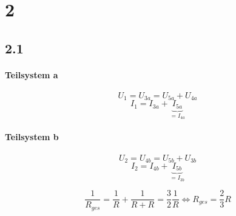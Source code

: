 \documentclass{article}
\begin{document}
\section*{2}
\subsection*{2.1}
\paragraph{Teilsystem a}
\begin{equation}
    U_1 = U_{3a} = U_{5a} + U_{4a}
\end{equation}
\begin{equation}
    I_1 = I_{3a} + \underbrace{I_{5a}}_{=I_{4a}}
\end{equation}
\paragraph{Teilsystem b}
\begin{equation}
    U_2 = U_{4b} = U_{5b} + U_{3b}
\end{equation}
\begin{equation}
    I_2 = I_{4b} + \underbrace{I_{5b}}_{=I_{3b}}
\end{equation}

\begin{equation}
    \frac{1}{R_{ges}} = \frac{1}{R} + \frac{1}{R+R} = \frac{3}{2}\frac{1}{R} \Leftrightarrow
    R_{ges} = \frac{2}{3}R
\end{equation}
\end{document}
